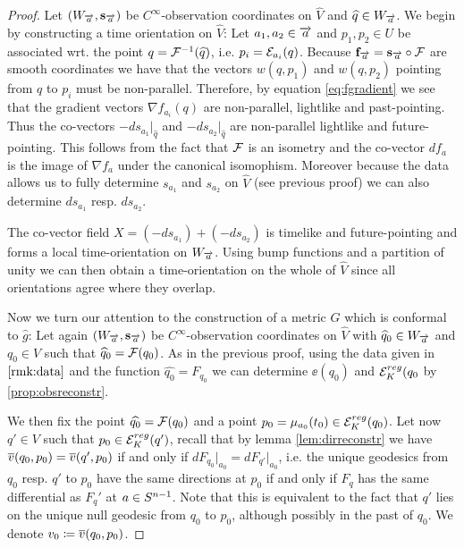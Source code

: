 \begin{proof}
    Let $(W_\aa,\mathbf{s}_\aa)$ be $C^\infty$-observation coordinates on $\widehat{V}$ and $\widehat{q}\in W_\aa$.
    We begin by constructing a time orientation on $\widehat{V}$:
    Let $a_1, a_2\in \aa$ and $p_1,p_2\in U$ be associated wrt. the point $q=\F^{-1}(\widehat{q})$, i.e. $p_i=\mc{E}_{a_i}(q)$.
    Because $\mathbf{f}_\aa = \mathbf{s}_\aa \circ \F$ are smooth coordinates we have that the vectors $w(q,p_1)$ and $w(q,p_2)$ pointing from $q$ to $p_i$ must be non-parallel. Therefore, by equation \eqref{eq:fgradient} we see that the gradient vectors $\nabla f_{a_i}(q)$ are non-parallel, lightlike and past-pointing. 
    Thus the co-vectors $-ds_{a_1}\rvert_{\widehat{q}}$ and $-ds_{a_2}\rvert_{\widehat{q}}$ are non-parallel lightlike and future-pointing. This follows from the fact that $\F$ is an isometry and the co-vector $df_a$ is the image of  $\nabla f_a$ under the canonical isomophism. Moreover because the data allows us to fully determine $s_{a_1}$ and $s_{a_2}$ on $\widehat{V}$ (see previous proof) we can also determine $ds_{a_1}$ resp. $ds_{a_2}$.
    
    The co-vector field $X=(-ds_{a_1})+(-ds_{a_2})$ is timelike and future-pointing and forms a local time-orientation on $W_\aa$. Using bump functions and a partition of unity we can then obtain a time-orientation on the whole of $\widehat{V}$ since all orientations agree where they overlap.
    
    Now we turn our attention to the construction of a metric $G$ which is conformal to $\widehat{g}$: Let again $(W_\aa,\mathbf{s}_\aa)$ be $C^\infty$-observation coordinates on $\widehat{V}$ with $\widehat{q}_0\in W_\aa$ and $q_0\in V$ such that $\widehat{q}_0=\F(q_0)$. As in the previous proof, using the data given in $\ref{rmk:data}$ and the function $\widehat{q_0}=F_{q_0}$ we can determine $\ee(q_0)$ and $\er(q_0$ by \ref{prop:obsreconstr}.
    
    We then fix the point $\widehat{q_0}=\F(q_0)$ and a point $p_0=\mu_{a_0}(t_0)\in \er(q_0)$. Let now $q'\in V$ such that $p_0\in \er(q')$, recall that by lemma \ref{lem:dirreconstr} we have $\cl{v}(q_0,p_0)=\cl{v}(q',p_0)$ if and only if $dF_{q_0}\rvert_{a_0}=dF_{q'}\rvert_{a_0}$, i.e. the unique geodesics from $q_0$ resp. $q'$ to $p_0$ have the same directions at $p_0$ if and only if $F_q$ has the same differential as $F_q'$ at $a\in \sn$. Note that this is equivalent to the fact that $q'$ lies on the unique null geodesic from $q_0$ to $p_0$, although possibly in the past of $q_0$. We denote $v_0 \coloneqq \cl{v}(q_0,p_0)$.
    

\end{proof}
